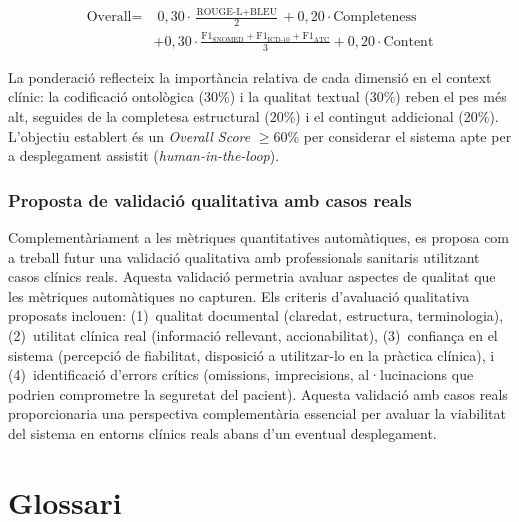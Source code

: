 \documentclass[CAT]{TFUOC}%
\begin{document}
\begin{equation*}
\begin{split}
\text{Overall} = & \; 0{,}30 \cdot \frac{\text{ROUGE-L}+\text{BLEU}}{2} + 0{,}20 \cdot \text{Completeness} \\
& + 0{,}30 \cdot \frac{\text{F1}_\text{SNOMED}+\text{F1}_\text{ICD-10}+\text{F1}_\text{ATC}}{3} + 0{,}20 \cdot \text{Content}
\end{split}
\end{equation*}

La ponderació reflecteix la importància relativa de cada dimensió en el context clínic: la codificació ontològica (30\%) i la qualitat textual (30\%) reben el pes més alt, seguides de la completesa estructural (20\%) i el contingut addicional (20\%). L'objectiu establert és un \textit{Overall Score} $\geq$60\% per considerar el sistema apte per a desplegament assistit (\textit{human-in-the-loop}).

\subsection{Proposta de validació qualitativa amb casos reals}

Complementàriament a les mètriques quantitatives automàtiques, es proposa com a treball futur una validació qualitativa amb professionals sanitaris utilitzant casos clínics reals. Aquesta validació permetria avaluar aspectes de qualitat que les mètriques automàtiques no capturen. Els criteris d'avaluació qualitativa proposats inclouen: (1)~qualitat documental (claredat, estructura, terminologia), (2)~utilitat clínica real (informació rellevant, accionabilitat), (3)~confiança en el sistema (percepció de fiabilitat, disposició a utilitzar-lo en la pràctica clínica), i (4)~identificació d'errors crítics (omissions, imprecisions, al·lucinacions que podrien comprometre la seguretat del pacient). Aquesta validació amb casos reals proporcionaria una perspectiva complementària essencial per avaluar la viabilitat del sistema en entorns clínics reals abans d'un eventual desplegament.

\chapter{Glossari}
\end{document}
